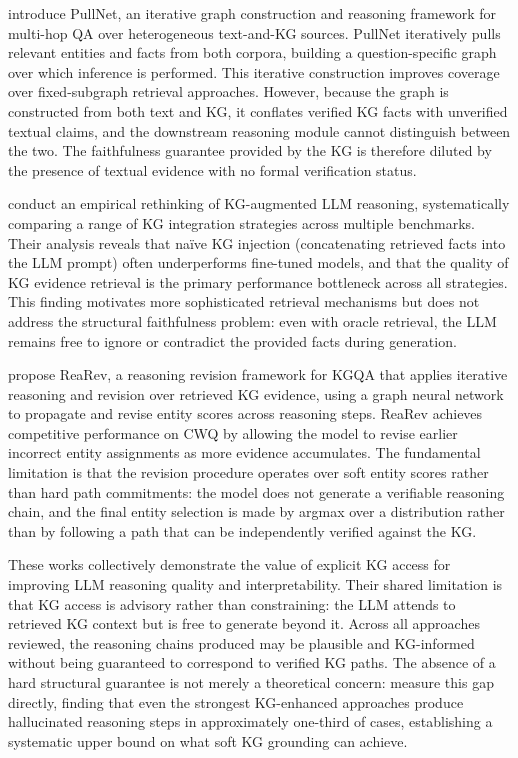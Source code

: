 \citet{sun2019pullnet} introduce PullNet, an iterative graph construction and reasoning framework for multi-hop QA over heterogeneous text-and-KG sources. PullNet iteratively pulls relevant entities and facts from both corpora, building a question-specific graph over which inference is performed. This iterative construction improves coverage over fixed-subgraph retrieval approaches. However, because the graph is constructed from both text and KG, it conflates verified KG facts with unverified textual claims, and the downstream reasoning module cannot distinguish between the two. The faithfulness guarantee provided by the KG is therefore diluted by the presence of textual evidence with no formal verification status.

\citet{he2022rethinkingKG} conduct an empirical rethinking of KG-augmented LLM reasoning, systematically comparing a range of KG integration strategies across multiple benchmarks. Their analysis reveals that na\"{i}ve KG injection (concatenating retrieved facts into the LLM prompt) often underperforms fine-tuned models, and that the quality of KG evidence retrieval is the primary performance bottleneck across all strategies. This finding motivates more sophisticated retrieval mechanisms but does not address the structural faithfulness problem: even with oracle retrieval, the LLM remains free to ignore or contradict the provided facts during generation.

\citet{mavromatis2022rearev} propose ReaRev, a reasoning revision framework for KGQA that applies iterative reasoning and revision over retrieved KG evidence, using a graph neural network to propagate and revise entity scores across reasoning steps. ReaRev achieves competitive performance on CWQ by allowing the model to revise earlier incorrect entity assignments as more evidence accumulates. The fundamental limitation is that the revision procedure operates over soft entity scores rather than hard path commitments: the model does not generate a verifiable reasoning chain, and the final entity selection is made by argmax over a distribution rather than by following a path that can be independently verified against the KG.

These works collectively demonstrate the value of explicit KG access for improving LLM reasoning quality and interpretability. Their shared limitation is that KG access is advisory rather than constraining: the LLM attends to retrieved KG context but is free to generate beyond it. Across all approaches reviewed, the reasoning chains produced may be plausible and KG-informed without being guaranteed to correspond to verified KG paths. The absence of a hard structural guarantee is not merely a theoretical concern: \citet{luo2024gcr} measure this gap directly, finding that even the strongest KG-enhanced approaches produce hallucinated reasoning steps in approximately one-third of cases, establishing a systematic upper bound on what soft KG grounding can achieve.

